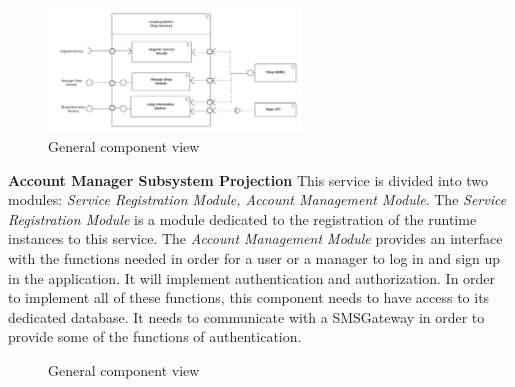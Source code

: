 \begin{figure}[h!]
    \centering
    \includegraphics[width=0.6\textwidth]{Images/ComponentViewShopServices.png}
    \caption{\label{fig:ComponentViewShopServices}{General component view}}
\end{figure}

\textbf{Account Manager Subsystem Projection}
This service is divided into two modules: \textit{Service Registration Module, Account Management Module}. 
The \textit{Service Registration Module} is a module dedicated to the registration of the runtime instances to this service.
The \textit{Account Management Module} provides an interface with the functions needed in order for a user or a manager to log in and sign up in the application. It will implement authentication and authorization. 
In order to implement all of these functions, this component needs to have access to its dedicated database. It needs to communicate with a SMSGateway in order to provide some of the functions of authentication. 

\begin{figure}[h!]
    \centering
    \caption{\label{fig:ComponentViewAccountManagerServices}{General component view}}
\end{figure}




